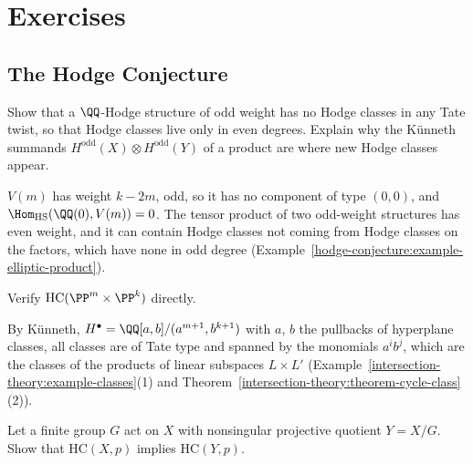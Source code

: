 \section{Exercises}\label{hodge-conjecture:section-exercises}

\subsection{The Hodge Conjecture}\label{hodge-conjecture:subsection-exercises-the-hodge-conjecture}

\begin{exercise}\label{hodge-conjecture:exercise-odd-weight}
Show that a $\QQ$-Hodge structure of odd weight has no Hodge classes in any Tate twist, so that Hodge classes live only in even degrees. Explain why the K\"unneth summands
$H^{\mathrm{odd}}(X) \otimes H^{\mathrm{odd}}(Y)$ of a product are where new Hodge classes appear.
\end{exercise}

\begin{solution}
$V(m)$ has weight $k - 2m$, odd, so it has no component of type $(0,0)$, and $\Hom_{\mathrm{HS}}(\QQ(0), V(m)) = 0$. The tensor product of two odd-weight structures has even weight, and it can
contain Hodge classes not coming from Hodge classes on the factors, which have none in odd degree (Example~\ref{hodge-conjecture:example-elliptic-product}).
\end{solution}

\begin{exercise}\label{hodge-conjecture:exercise-projective-product}
Verify $\mathrm{HC}(\PP^m \times \PP^k)$ directly.
\end{exercise}

\begin{solution}
By K\"unneth, $H^\bullet = \QQ[a, b]/(a^{m+1}, b^{k+1})$ with $a$, $b$ the pullbacks of hyperplane classes, all classes are of Tate type and spanned by the monomials $a^ib^j$, which are the classes
of the products of linear subspaces $L \times L'$ (Example~\ref{intersection-theory:example-classes}(1) and Theorem~\ref{intersection-theory:theorem-cycle-class}(2)).
\end{solution}

\begin{exercise}\label{hodge-conjecture:exercise-finite-quotient}
Let a finite group $G$ act on $X$ with nonsingular projective quotient $Y = X/G$. Show that $\mathrm{HC}(X, p)$ implies $\mathrm{HC}(Y, p)$.
\end{exercise}


